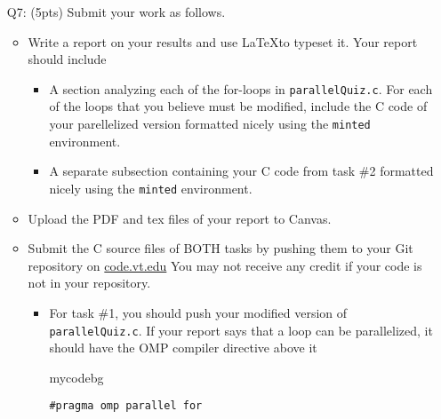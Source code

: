 \begin{itemize}
    \item[Q7:] (5pts) Submit your work as follows.
    \begin{itemize}
        \item Write a report on your results and use \LaTeX to typeset it. Your report should include
        \begin{itemize}
            \item A section analyzing each of the for-loops in \texttt{parallelQuiz.c}.
            For each of the loops that you believe must be modified, include the C code of your parellelized version formatted nicely using the \texttt{minted} environment.
            \item A separate subsection containing your C code from task \#2 formatted nicely using the \texttt{minted} environment.
        \end{itemize}
        \item Upload the PDF and tex files of your report to Canvas.
        \item Submit the C source files of BOTH tasks by pushing them to your Git repository on \href{http://code.vt.edu}{code.vt.edu}
        You may not receive any credit if your code is not in your repository.
        \begin{itemize}
            \item For task \#1, you should push your modified version of \texttt{parallelQuiz.c}.
            If your report says that a loop can be parallelized, it should have the OMP compiler directive above it
            \begin{tsession}{mycodebg}
            \begin{verbatim}
#pragma omp parallel for\end{verbatim}
            \end{tsession}
        \end{itemize}
    \end{itemize}
\end{itemize}
